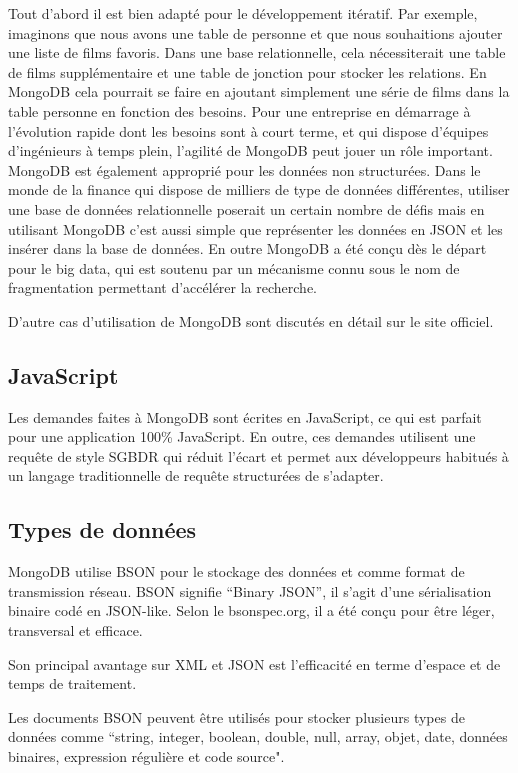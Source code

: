 Tout d’abord il est bien adapté pour le développement itératif. Par exemple, imaginons que nous avons une table de personne et que nous souhaitions ajouter une liste de films favoris. Dans une base relationnelle, cela nécessiterait une table de films supplémentaire et une table de jonction pour stocker les relations. En MongoDB cela pourrait se faire en ajoutant simplement une série de films dans la table personne en fonction des besoins. Pour une entreprise en démarrage à l’évolution rapide dont les besoins sont à court terme, et qui dispose d'équipes d'ingénieurs à temps plein, l’agilité de MongoDB peut jouer un rôle important.
MongoDB est également approprié pour les données non structurées. Dans le monde de la finance qui dispose de milliers de type de données différentes, utiliser une base de données relationnelle poserait un certain nombre de défis mais en utilisant MongoDB c’est aussi simple que représenter les données en JSON et les insérer dans la base de données.
En outre MongoDB a été conçu dès le départ pour le big data, qui est soutenu par un mécanisme connu sous le nom de fragmentation permettant d'accélérer la recherche.

D’autre cas d’utilisation de MongoDB sont discutés en détail sur le site officiel.

\subsection{JavaScript}

Les demandes faites à MongoDB sont écrites en JavaScript, ce qui est parfait pour une application 100\% JavaScript. En outre, ces demandes utilisent une requête de style SGBDR qui réduit l’écart et permet aux développeurs habitués à un langage traditionnelle de requête structurées de s'adapter.

\subsection{Types de données}

MongoDB utilise BSON pour le stockage des données et comme format de transmission réseau. BSON signifie “Binary JSON”, il s'agit d'une sérialisation binaire codé en JSON-like.
Selon le bsonspec.org, il a été conçu pour être léger, transversal et efficace.

Son principal avantage sur XML et JSON est l’efficacité en terme d’espace et de temps de traitement.

Les documents BSON peuvent être utilisés pour stocker plusieurs types de données comme “string, integer, boolean, double, null, array, objet, date, données binaires, expression régulière et code source".

